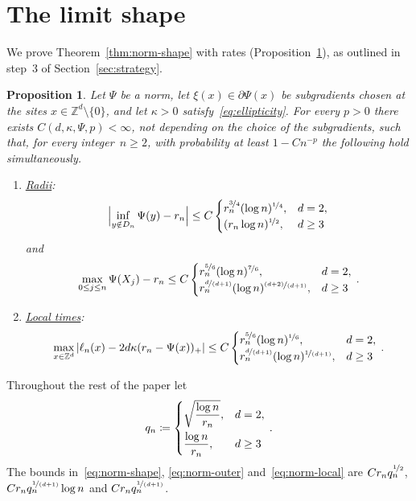 \documentclass[11pt]{amsart}
\theoremstyle{plain}
\newtheorem{proposition}[theorem]{Proposition}
\theoremstyle{definition}
\newcommand{\Z}{\mathbb Z}
\newcommand{\drift}{\kappa}
\newcommand{\gauge}{\Psi}
\newcommand{\nf}{\nicefrac}
\numberwithin{equation}{section}
\begin{document}
\section{The limit shape}\label{sec:norms}

We prove Theorem~\ref{thm:norm-shape} with rates (Proposition~\ref{prop:norm-shape}), as outlined in step~3 of Section~\ref{sec:strategy}.

\begin{proposition}\label{prop:norm-shape}
Let $\gauge$ be a norm, let $\xi(x)\in\partial \gauge(x)$ be subgradients chosen at the sites $x\in\Z^d\setminus\{0\}$, and let $\drift>0$ satisfy~\eqref{eq:ellipticity}. For every $p>0$ there exists $C(d,\drift,\gauge,p)<\infty$, not depending on the choice of the subgradients, such that, for every integer~$n\geq2$, with probability at least $1-Cn^{-p}$ the following hold simultaneously.
\begin{enumerate}[label=\textup{(\roman*)}]
\item \underline{\emph{Radii}}:
\begin{equation}\label{eq:norm-shape}
\Bigl|\inf_{y\notin D_n}\gauge(y)-r_n\Bigr|\leq C\begin{cases}r_n^{\nf34}(\log n)^{\nf14},&d=2,\\(r_n\log n)^{\nf12},&d\geq3\end{cases}
\end{equation}
and
\begin{equation}\label{eq:norm-outer}
\max_{0\leq j\leq n}\gauge(X_j)-r_n\leq C\begin{cases}r_n^{\nf56}(\log n)^{\nf76},&d=2,\\r_n^{\nf{d}{(d+1)}}(\log n)^{\nf{(d+2)}{(d+1)}},&d\geq3\end{cases}\, .
\end{equation}
\item \underline{\emph{Local times}}:
\begin{equation}\label{eq:norm-local}
\max_{x\in\Z^d}|\ell_n(x)-2d\drift(r_n-\gauge(x))_+|\leq C\begin{cases}r_n^{\nf56}(\log n)^{\nf16},&d=2,\\r_n^{\nf{d}{(d+1)}}(\log n)^{\nf{1}{(d+1)}},&d\geq3\end{cases}\, .
\end{equation}
\end{enumerate}
\end{proposition}

Throughout the rest of the paper let
\begin{equation}\label{eq:qn}
q_n\coloneqq\begin{dcases}\sqrt{\frac{\log n}{r_n}},&d=2,\\\frac{\log n}{r_n},&d\geq3\end{dcases}\, .
\end{equation}
The bounds in~\eqref{eq:norm-shape}, \eqref{eq:norm-outer} and~\eqref{eq:norm-local} are $Cr_nq_n^{\nf12}$, $Cr_nq_n^{\nf{1}{(d+1)}}\log n$ and $Cr_nq_n^{\nf{1}{(d+1)}}$.
\end{document}

